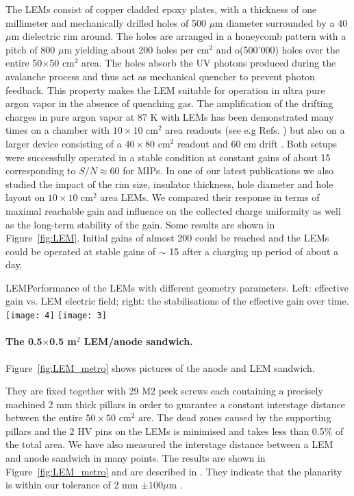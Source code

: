 The LEMs consist of copper cladded epoxy plates, with a thickness of one millimeter and mechanically drilled holes of 500 $\mu$m diameter
surrounded by a 40 $\mu$m dielectric rim around. The holes are arranged in a honeycomb pattern with a pitch of 800 $\mu$m yielding
about 200 holes per cm$^2$ and o(500'000) holes over the entire 50$\times$50 cm$^2$ area. The holes absorb the UV photons produced during the
avalanche process and thus act as mechanical quencher to prevent photon feedback. This property makes the LEM suitable for operation in
ultra pure argon vapor in the absence of quenching gas.  The amplification of the drifting charges in pure argon vapor at 87 K with
LEMs has been demonstrated many times on a chamber with $10\times10$ cm$^2$ area readouts (see e.g
Refs. \cite{Badertscher:2008rf,Badertscher:2010fi} ) but also on a larger device consisting of a $40\times80$ cm$^2$ readout and 60 cm
drift \cite{Badertscher:2013wm}.  Both setups were successfully operated in a stable condition at constant gains of about 15
corresponding to $S/N\approx 60$ for MIPs. In one of our latest publications \cite{Cantini:2014xza} we also studied the impact of the
rim size, insulator thickness, hole diameter and hole layout on $10\times10$ cm$^2$ area LEMs. We compared their response in terms of
maximal reachable gain and influence on the collected charge uniformity as well as the long-term stability of the gain. Some
results are shown in Figure~\ref{fig:LEM}.  Initial gains of almost 200 could be reached and the LEMs could be operated at stable gains of
$\sim$ 15 after a charging up period of about a day.

\begin{cdrfigure}{LEM}{Performance of the LEMs with different geometry
      parameters. Left: effective gain vs. LEM electric field; right:
      the stabilisations of the effective gain over time.}
     \texttt{[image: 4]}
    \texttt{[image: 3]}
\end{cdrfigure}


\paragraph{The 0.5$\times$0.5 m$^2$ LEM/anode sandwich.}
Figure~\ref{fig:LEM_metro} shows pictures of the anode and LEM sandwich.  


They are fixed together with 29 M2 peek screws each containing a precisely machined 2 mm thick pillars in order to guarantee a
 constant interstage distance between the entire $50\times50$ cm$^2$ are.  The dead zones caused by the supporting pillars and the 2 HV
 pins on the LEMs is minimised and takes less than 0.5\% of the total area.  We have also measured the interstage distance between
 a LEM and anode sandwich in many points. The results are shown in Figure~\ref{fig:LEM_metro} and are described in \cite{EDMS_metro_lem_anode}. They indicate that the planarity is within our tolerance of 2 mm $\pm 100 \mu$m .


